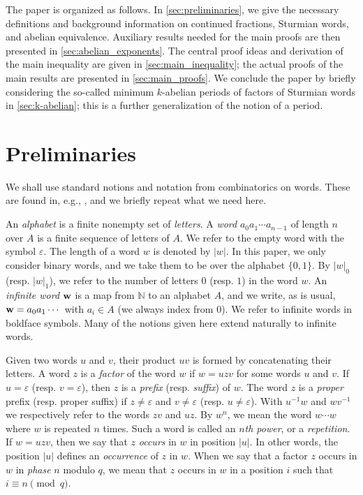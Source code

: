 \documentclass[a4paper,fleqn]{article}
\providecommand{\abs}[1]{\lvert#1\rvert}
\newcommand{\infw}[1]{%
  \ifcat\noexpand#1\relax\bm{#1}%
  \else\mathbf{#1}\fi}          %
\newcommand{\N}{\mathbb{N}}
\begin{document}
  The paper is organized as follows. In \autoref{sec:preliminaries}, we give the necessary definitions and background
  information on continued fractions, Sturmian words, and abelian equivalence. Auxiliary results needed for the main
  proofs are then presented in \autoref{sec:abelian_exponents}. The central proof ideas and derivation of the main
  inequality are given in \autoref{sec:main_inequality}; the actual proofs of the main results are presented in
  \autoref{sec:main_proofs}. We conclude the paper by briefly considering the so-called minimum $k$-abelian periods of
  factors of Sturmian words in \autoref{sec:k-abelian}; this is a further generalization of the notion of a period.
  
  \section{Preliminaries}\label{sec:preliminaries}
  We shall use standard notions and notation from combinatorics on words. These are found in, e.g.,
  \cite{2002:algebraic_combinatorics_on_words}, and we briefly repeat what we need here.

  An \emph{alphabet} is a finite nonempty set of \emph{letters}. A \emph{word} $a_0 a_1 \dotsm a_{n-1}$ of length $n$
  over $A$ is a finite sequence of letters of $A$. We refer to the empty word with the symbol $\varepsilon$. The length
  of a word $w$ is denoted by $\abs{w}$. In this paper, we only consider binary words, and we take them to be over the
  alphabet $\{0, 1\}$. By $\abs{w}_0$ (resp. $\abs{w}_1$), we refer to the number of letters $0$ (resp. $1$) in the
  word $w$. An \emph{infinite word} $\infw{w}$ is a map from $\N$ to an alphabet $A$, and we write, as is usual,
  $\infw{w} = a_0 a_1 \dotsm$ with $a_i \in A$ (we always index from $0$). We refer to infinite words in boldface
  symbols. Many of the notions given here extend naturally to infinite words.

  Given two words $u$ and $v$, their product $uv$ is formed by concatenating their letters. A word $z$ is a
  \emph{factor} of the word $w$ if $w = uzv$ for some words $u$ and $v$. If $u = \varepsilon$ (resp.
  $v = \varepsilon$), then $z$ is a \emph{prefix} (resp. \emph{suffix}) of $w$. The word $z$ is a \emph{proper} prefix
  (resp. proper suffix) if $z \neq \varepsilon$ and $v \neq \varepsilon$ (resp. $u \neq \varepsilon$). With $u^{-1}w$
  and $wv^{-1}$ we respectively refer to the words $zv$ and $uz$. By $w^n$, we mean the word $w \dotsm w$ where $w$ is
  repeated $n$ times. Such a word is called an \emph{$n$th power}, or a \emph{repetition}. If $w = uzv$, then we say
  that $z$ \emph{occurs} in $w$ in position $\abs{u}$. In other words, the position $\abs{u}$ defines an
  \emph{occurrence} of $z$ in $w$. When we say that a factor $z$ occurs in $w$ in \emph{phase} $n$ modulo $q$, we mean
  that $z$ occurs in $w$ in a position $i$ such that $i \equiv n \pmod{q}$.
\end{document}
